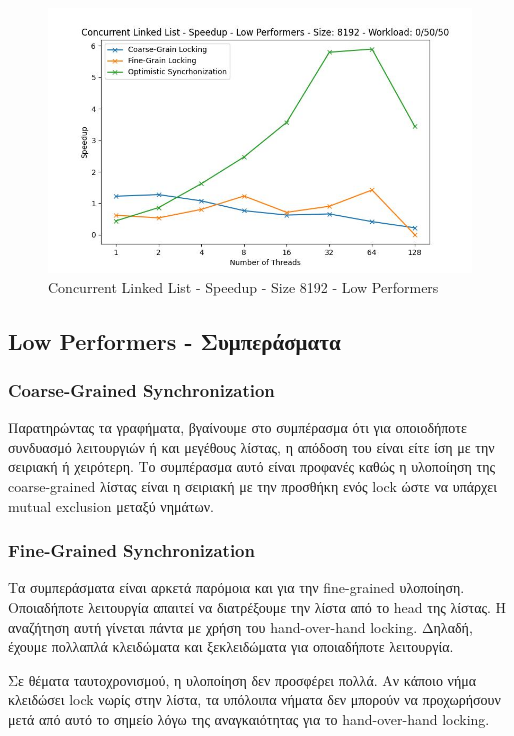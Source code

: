 \documentclass[../final_report.tex]{subfiles}
\begin{document}
\begin{figure}[H]
        \includegraphics[scale=0.4]{outFiles/plots/concurrent_data_structs_low_speedup_8192_0_50_50.jpg}
    \caption{Concurrent Linked List - Speedup - Size 8192 - Low Performers}
    \label{fig:Concurrent Linked List - Speedup - Size 8192 - Low Performers}
\end{figure}

\subsection*{Low Performers - Συμπεράσματα}

\subsubsection*{Coarse-Grained Synchronization}
Παρατηρώντας τα γραφήματα, βγαίνουμε στο συμπέρασμα ότι για οποιοδήποτε συνδυασμό λειτουργιών ή και
μεγέθους λίστας, η απόδοση του είναι είτε ίση με την σειριακή ή χειρότερη. Το συμπέρασμα αυτό είναι 
προφανές καθώς η υλοποίηση της coarse-grained λίστας είναι η σειριακή με την προσθήκη ενός lock ώστε
να υπάρχει mutual exclusion μεταξύ νημάτων. 

\subsubsection*{Fine-Grained Synchronization}
Τα συμπεράσματα είναι αρκετά παρόμοια και για την fine-grained υλοποίηση. Οποιαδήποτε λειτουργία απαιτεί να διατρέξουμε
την λίστα από το head της λίστας. Η αναζήτηση αυτή γίνεται πάντα με χρήση του hand-over-hand locking. Δηλαδή, έχουμε πολλαπλά
κλειδώματα και ξεκλειδώματα για οποιαδήποτε λειτουργία.

Σε θέματα ταυτοχρονισμού, η υλοποίηση δεν προσφέρει πολλά. Αν κάποιο νήμα κλειδώσει lock νωρίς στην λίστα, τα υπόλοιπα νήματα
δεν μπορούν να προχωρήσουν μετά από αυτό το σημείο λόγω της αναγκαιότητας για το hand-over-hand locking. 
\end{document}
